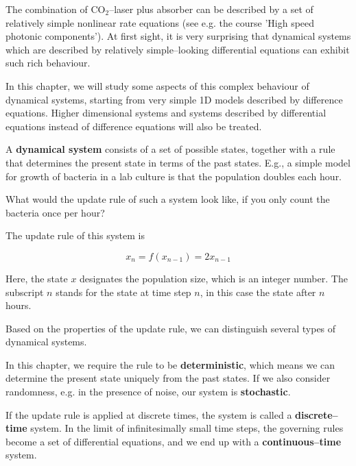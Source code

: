 The combination of CO$_2$--laser plus absorber can be described by a set of relatively simple nonlinear rate equations (see e.g. the course 'High speed photonic components'). At first sight, it is very surprising that dynamical systems which are described by relatively simple--looking differential equations can exhibit such rich behaviour.

In this chapter, we will study some aspects of this complex behaviour of dynamical systems, starting from very simple 1D models described by difference equations. Higher dimensional systems and systems described by differential equations instead of difference equations will also be treated.



A \textbf{dynamical system} consists of a set of possible states, together with a rule that determines the present state in terms of the past states. E.g., a simple model for growth of bacteria in a lab culture is that the population doubles each hour.

\begin{cue}
  What would the update rule of such a system look like, if you only count the bacteria once per hour?
\end{cue}

The update rule of this system is

\begin{equation}
x_n = f(x_{n-1}) = 2 x_{n-1} \label{eq-exp-growth}
\end{equation}

Here, the state $x$ designates the population size, which is an integer number. The subscript $n$ stands for the state at time step $n$, in this case the state after $n$ hours.  

Based on the properties of the update rule, we can distinguish several types of dynamical systems.

In this chapter, we require the rule to be \textbf{deterministic}, which means we can determine the present state uniquely from the past states. If we also consider randomness, e.g. in the presence of noise, our system is \textbf{stochastic}.

If the update rule is applied at discrete times, the system is called a \textbf{discrete--time} system. In the limit of infinitesimally small time steps, the governing rules become a set of differential equations, and we end up with a \textbf{continuous--time} system.

\pagebreak

